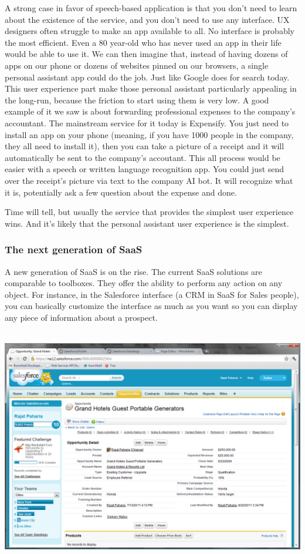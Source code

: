 \documentclass[12pt]{article}
\begin{document}
A strong case in favor of speech-based application is that you don't need to
learn about the existence of the service, and you don't need to use any
interface. UX designers often struggle to make an app available to all. No
interface is probably the most efficient. Even a 80 year-old who has never used
an app in their life would be able to use it. We can then imagine that, instead
of having dozens of apps on our phone or dozens of websites pinned on our
browsers, a single personal assistant app could do the job. Just like Google
does for search today. This user experience part make those personal assistant
particularly appealing in the long-run, because the friction to start using them
is very low. A good example of it we saw is about forwarding professional
expenses to the company's accountant. The mainstream service for it today is
Expensify. You just need to install an app on your phone (meaning, if you have
1000 people in the company, they all need to install it), then you can take a
picture of a receipt and it will automatically be sent to the company's
accoutant. This all process would be easier with a speech or written language
recognition app. You could just send over the receipt's picture via text to the
company AI bot. It will recognize what it is, potentially ask a few question
about the expense and done.

Time will tell, but usually the service that provides the simplest user
experience wins. And it's likely that the personal assistant user experience is
the simplest.


\subsubsection{The next generation of SaaS}

A new generation of SaaS is on the rise. The current SaaS solutions are comparable to toolboxes. They offer the ability to perform any action on any object. For instance, in the Salesforce interface (a CRM in SaaS for Sales people), you can basically customize the interface as much as you want so you can display any piece of information about a prospect. 


\\
\includegraphics[width=\textwidth]{salesforce}
\\
\end{document}
